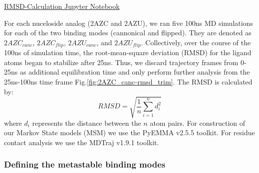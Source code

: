 \documentclass[fleqn,10pt]{wlscirep}
\begin{document}
\href{https://github.com/nathanmlim/Spitale/blob/master/manual_md/notebooks/RMSD-calculations.ipynb}{RMSD-Calculation Jupyter Notebook}

For each nuceloside analog (2AZC and 2AZU), we ran five 100ns MD simulations for each of the two binding modes (cannonical and flipped).
They are denoted as $2AZC_{canc}$, $2AZC_{flip}$, $2AZU_{canc}$, and $2AZU_{flip}$.
Collectively, over the course of the 100ns of simulation time, the root-mean-square deviation (RMSD) for the ligand atoms began to stabilize after 25ns.
Thus, we discard trajectory frames from 0-25ns as additional equilibration time and only perform further analysis from the 25ns-100ns time frame Fig.\ref{fig:2AZC_canc-rmsd_trim}.
The RMSD is calculated by:
\begin{equation}
    RMSD = \sqrt{ \frac{1}{n} \sum^{n}_{i=1}{d_{i}^{2}}}
\end{equation}
where $d_{i}$ represents the distance between the $n$ atom pairs.
For construction of our Markov State models (MSM) we use the PyEMMA v2.5.5 \cite{scherer2015pyemma} toolkit.
For residue contact analysis we use the MDTraj v1.9.1 \cite{mcgibbon2015mdtraj} toolkit.

\subsubsection{Defining the metastable binding modes}
\end{document}
